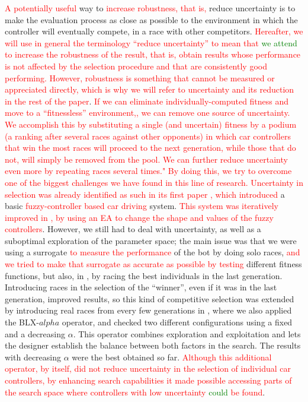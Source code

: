 \documentclass[10pt,journal,compsoc]{IEEEtran}
\begin{document}
\textcolor{red}{A potentially useful} way to \textcolor{red}{increase robustness, that
is, }reduce uncertainty is to make the evaluation process
as close as possible to the environment in which the controller will
eventually compete, in a race with other competitors. \textcolor{red}{Hereafter, we will use in general the
  terminology ``reduce uncertainty'' to mean that \textcolor{green}{we attend} to increase the robustness of the result, that is, obtain results whose
  performance is not affected by the selection procedure and that are
  consistently good performing. However, robustness is something that
  cannot be measured or appreciated directly, which is why we will
  refer to uncertainty and its reduction in the rest of the paper}.
\textcolor{red}{
	If we can eliminate \textcolor{red}{individually-computed} fitness and move to a ``fitnessless'' environment,, we can remove one source of uncertainty. We accomplish this by substituting a single (and uncertain) fitness  by a podium (a ranking after several races against other opponents) 
	in which car controllers that win the most races will proceed to the next generation, while those that do not, will simply be removed from the pool. We can further reduce uncertainty even more by repeating
	races several times."}
\textcolor{red}{By doing this, we try to overcome one of the biggest
challenges we have found in this line of research. Uncertainty in
selection was already identified as such in its first paper
\cite{salem_evo17}, which introduced} a basic
\textcolor{red}{fuzzy-controller based car driving}
system. \textcolor{red}{This system was iteratively improved in
\cite{salem_evo18,salem_cig2018}, by using an EA to change the shape
and values of the fuzzy controllers}. However, we still had to deal
with uncertainty, as well as a suboptimal exploration of the parameter
space; the main issue was that we were using a surrogate
\textcolor{red}{to measure the performance} of the bot by doing solo
races, \textcolor{red}{and we tried to make that surrogate as accurate as
  possible by testing} different
fitness functions, but also, in \cite{salem_cig2018}, by racing the best individuals in the last
generation. Introducing
races in the selection of the ``winner'', even if it was in the last
generation, improved results, so this kind of competitive selection
was extended by introducing real races from every few generations in
\cite{DBLP:conf/cig/SalemMG19}, where we also applied the BLX-$alpha$
operator, and checked two different configurations using a fixed and a
decreasing $\alpha$. This operator combines exploration and
exploitation and lets the designer establish the balance between both factors in the search. The
results with decreasing $\alpha$ were the best obtained so
far. \textcolor{red}{Although this additional operator, by itself, did
  not reduce uncertainty in the selection of individual car
  controllers, by enhancing search capabilities it made possible
  accessing parts of the search space where controllers with low
  uncertainty \textcolor{green}{could} be found}.
\end{document}
